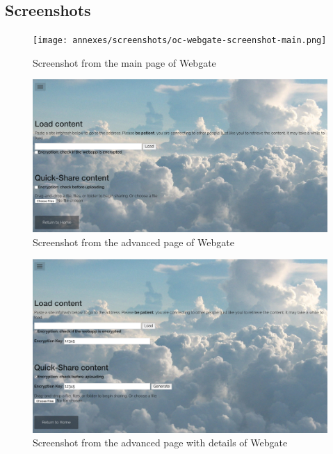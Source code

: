 
\subsection{Screenshots}

\begin{figure}[htpb]
\centering
\begin{adjustbox}{center}
\texttt{[image: annexes/screenshots/oc-webgate-screenshot-main.png]}
\end{adjustbox}
\caption{Screenshot from the main page of Webgate
\label{fig:oc-webgate-screenshot-main}}  
\end{figure}

\begin{figure}[htpb]
\centering
\begin{adjustbox}{center}
\includegraphics[scale=0.41]{annexes/screenshots/oc-webgate-screenshot-advanced.png}
\end{adjustbox}
\caption{Screenshot from the advanced page of Webgate
\label{fig:oc-webgate-screenshot-advanced}} 
\end{figure}

\begin{figure}[htpb]
\centering
\begin{adjustbox}{center}
\includegraphics[scale=0.41]{annexes/screenshots/oc-webgate-screenshot-advanced-detailed.png}
\end{adjustbox}
\caption{Screenshot from the advanced page with details of Webgate
\label{fig:oc-webgate-screenshot-advanced-detailed}} 
\end{figure}



